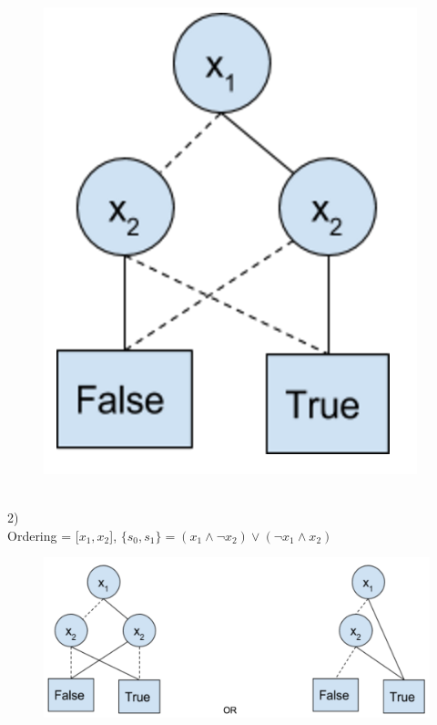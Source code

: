 \documentclass{article}
\begin{document}
\begin{figure}[!htb]
  \includegraphics[width=\linewidth]{6a2.png}
\endminipage\hfill
\end{figure} \\
2) \\
Ordering = [$x_1, x_2$], $\{s_0,s_1\} = (x_1 \land \neg x_2) \lor (\neg x_1 \land x_2)$
\begin{figure}[!htb]
  \includegraphics[width=\linewidth]{6b1.png}
\endminipage\hfill
\end{figure}
\end{document}

